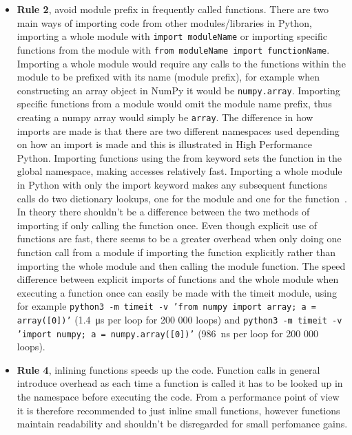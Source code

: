 \documentclass[12pt, a4paper]{article}
\begin{document}
\begin{itemize}
    \item \textbf{Rule 2}, avoid module prefix in frequently called functions.
    There are two main ways of importing code from other modules/libraries in Python, importing a whole module with \texttt{import moduleName} or importing specific functions from the module with \texttt{from moduleName import functionName}.
    Importing a whole module would require any calls to the functions within the module to be prefixed with its name (module prefix), for example when constructing an array object in NumPy it would be \texttt{numpy.array}.
    Importing specific functions from a module would omit the module name prefix, thus creating a numpy array would simply be \texttt{array}.
    The difference in how imports are made is that there are two different namespaces used depending on how an import is made and this is illustrated in High Performance Python.
    Importing functions using the from keyword sets the function in the global namespace, making accesses relatively fast.
    Importing a whole module in Python with only the import keyword makes any subsequent functions calls do two dictionary lookups, one for the module and one for the function~\cite{oreillyCh4}.
    In theory there shouldn't be a difference between the two methods of importing if only calling the function once.
    Even though explicit use of functions are fast, there seems to be a greater overhead when only doing one function call from a module if importing the function explicitly rather than importing the whole module and then calling the module function.
    The speed difference between explicit imports of functions and the whole module when executing a function once can easily be made with the timeit module, using for example \texttt{python3 -m timeit -v 'from numpy import array; a = array([0])'} (\SI{1.4}{\micro\second} per loop for 200 000 loops) and \texttt{python3 -m timeit -v 'import numpy; a = numpy.array([0])'} (\SI{986}{\nano\second} per loop for 200 000 loops).

    \newpage
    \item \textbf{Rule 4}, inlining functions speeds up the code.
    Function calls in general introduce overhead as each time a function is called it has to be looked up in the namespace before executing the code.
    From a performance point of view it is therefore recommended to just inline small functions, however functions maintain readability and shouldn't be disregarded for small perfomance gains. 


\end{itemize}
\end{document}
